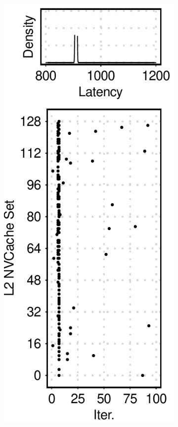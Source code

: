 \begin{figure}[t]
    \centering
    \begin{subfigure}[b]{.12\textwidth}
        \centering
        \includegraphics[width=\linewidth]{figure/plot/reference/fig12-side-sql-u1.pdf}

\end{subfigure}
\end{figure}
